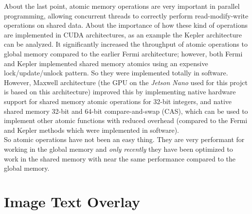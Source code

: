 \documentclass[paper=a4, fontsize=10pt]{scrartcl}	%
\begin{document}
	About the last point, atomic memory operations are very important in parallel programming, allowing concurrent threads to correctly perform read-modify-write operations on shared data. About the importance of how these kind of operations are implemented in CUDA architectures, as an example the Kepler architecture can be analyzed. It significantly increased the throughput of atomic operations to global memory compared to the earlier Fermi architecture; however, both Fermi and Kepler implemented shared memory atomics using an expensive lock/update/unlock pattern. So they were implemented totally in software.\\

	However, Maxwell architecture (the GPU on the \textit{Jetson Nano} used for this projct is based on this architecture) improved this by implementing native hardware support for shared memory atomic operations for 32-bit integers, and native shared memory 32-bit and 64-bit compare-and-swap (CAS), which can be used to implement other atomic functions with reduced overhead (compared to the Fermi and Kepler methods which were implemented in software).\\

	So atomic operations have not been an easy thing. They are very performant for working in the global memory and \textit{only recently} they have been optimized to work in the shared memory with near the same performance compared to the global memory.


\section{Image Text Overlay}
\end{document}
